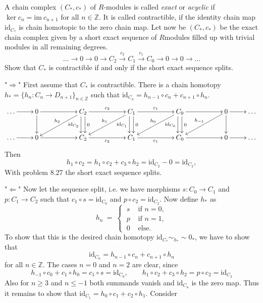 \documentclass[11pt]{book}
\numberwithin{dummy}{section}
\theoremstyle{nonumberbreak}
\newenvironment{sol}[1][]{\ifthenelse{\equal{#1}{}}{\solution}{\solution[#1]}\rm}{\endsolution}
\newenvironment{prob}[1][]{\ifthenelse{\equal{#1}{}}{\problem}{\problem[#1]}\rm}{\endproblem}
\newcommand{\la}{\longrightarrow}
\newcommand{\id}{\mathrm{id}}
\newcommand{\Z}{\mathbb{Z}}
\begin{document}
\begin{spacing}{1.4}
\begin{prob}
\begin{sol}
\begin{compactenum}
\end{compactenum}
\end{sol}
\end{prob}


\begin{prob}   %
A chain complex $(C_*,c_*)$ of $R$-modules is called \textit{exact} or \textit{acyclic} if $\ker c_n = \mathrm{im} \ c_{n+1}$ for all $n\in \Z$. It is called contractible, if the identity chain map $\id_{C_*}$ is chain homotopic to the zero chain map. Let now be $(C_*,c_*)$ be the exact chain complex given by a short exact sequence of $R$modules filled up with trivial modules in all remaining degrees.
$$\ldots \la 0 \la 0 \la C_2 \overset{c_2}{\la} C_1 \overset{c_1}{\la} C_0 \la 0 \la 0 \la \ldots $$
Show that $C_*$ is contractible if and only if the short exact sequence splits.
\begin{sol}
\begin{compactenum}
\item["$\Rightarrow$"] First assume that $C_*$ is contractible. There is a chain homotopy $h_* = \{h_n: C_n \la D_{n+1}\}_{n \in \Z}$ such that $\id_{C_n} = h_{n-1} \circ c_n + c_{n+1} \circ h_n$.
$$
\begin{xy}
\xymatrix{
\ldots \ar[r] & 0 \ar[d] \ar[rr] && C_2 \ar[lld]_{h_2} \ar[rr]^{c_2} \ar@<3pt>[d]^{0} \ar@<-3pt>[d]_{\id_{C_2}} && C_1 \ar[lld]_{h_1} \ar[rr]^{c_1} \ar@<3pt>[d]^{0} \ar@<-3pt>[d]_{\id_{C_1}} && C_0 \ar[lld]_{h_0} \ar[rr] \ar@<3pt>[d]^{0} \ar@<-3pt>[d]_{\id_{C_0}} && 0 \ar[lld]_{h_{-1}} \ar[r] \ar[d] & \ldots \\
\ldots \ar[r] &0 \ar[rr] && C_2 \ar[rr]_{c_2} && C_1 \ar[rr]_{c_1} && C_0 \ar[rr] && 0 \ar[r] & \ldots
}
\end{xy}
$$
Then 
$$h_1 \circ c_2 = h_1 \circ c_2 + c_3 \circ h_2 = \id_{C_2} - 0 = \id_{C_2},$$
With problem 8.27 the short exact sequence splits.

\item["$\Leftarrow$"] Now let the sequence split, i.e. we have morphisms $s: C_0 \la C_1$ and $p:C_1 \la C_2$ such that $c_1\circ s = \id_{C_0}$ and $p \circ c_2 = \id_{C_2}$. Now define $h_*$ as
$$h_n \ = \ \begin{cases} \ s & \textrm{ if }n=0, \\ \ p & \textrm{ if }n=1, \\ \ 0 & \textrm{ else. } \end{cases} $$
To show that this is the desired chain homotopy $\id_{C_*} \sim_{h_*} \sim 0_*$, we have to show that 
$$\id_{C_n} = h_{n-1} \circ c_n + c_{n+1} \circ h_n$$
for all $n \in \Z$. The cases $n=0$ and $n=2$ are clear, since
$$h_{-1} \circ c_0 + c_1 \circ h_0 = c_1 \circ s = \id_{C_0}, \qquad h_1 \circ c_2 + c_3 \circ h_2 = p \circ c_2 = \id_{C_2}$$
Also for $n \geqslant 3$ and $n\leqslant-1$ both summands vanish and $\id_{C_n}$ is the zero map. Thus it remains to show that $\id_{C_1}= h_0 \circ c_1 + c_2 \circ h_1$. Consider 


\end{compactenum}
\end{sol}
\end{prob}
\end{spacing}
\end{document}
